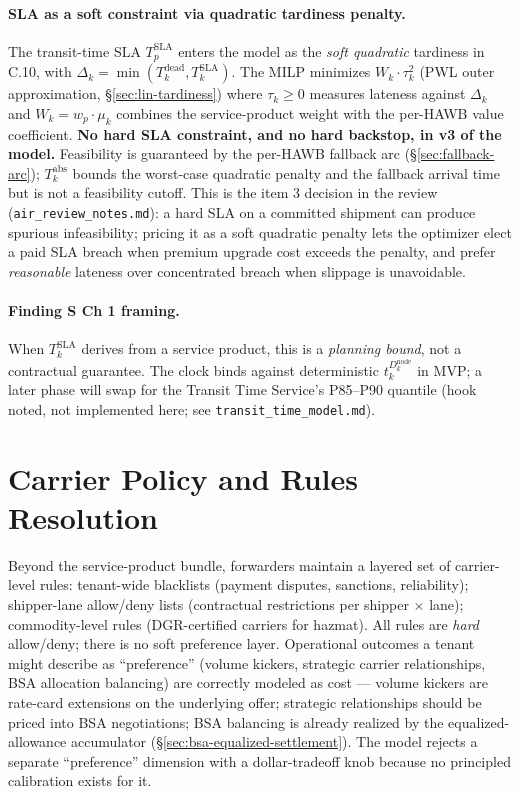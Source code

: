 \documentclass[11pt,a4paper]{article}
\theoremstyle{definition}
\begin{document}
\paragraph{SLA as a soft constraint via quadratic tardiness penalty.}
The transit-time SLA $T^{\text{SLA}}_p$ enters the model as the \emph{soft
quadratic} tardiness in C.10, with $\Delta_k = \min(T_k^{\text{dead}},
T_k^{\text{SLA}})$. The MILP minimizes $W_k \cdot \tau_k^2$ (PWL outer
approximation, \S\ref{sec:lin-tardiness}) where $\tau_k \geq 0$ measures
lateness against $\Delta_k$ and $W_k = w_p \cdot \mu_k$ combines the
service-product weight with the per-HAWB value coefficient.
\textbf{No hard SLA constraint, and no hard backstop, in v3 of the model.}
Feasibility is guaranteed by the per-HAWB fallback arc
(\S\ref{sec:fallback-arc}); $T_k^{\text{abs}}$ bounds the worst-case
quadratic penalty and the fallback arrival time but is not a feasibility
cutoff. This is the item 3 decision in the review
(\texttt{air\_review\_notes.md}): a hard SLA on a committed shipment can
produce spurious infeasibility; pricing it as a soft quadratic penalty lets
the optimizer elect a paid SLA breach when premium upgrade cost exceeds the
penalty, and prefer \emph{reasonable} lateness over concentrated breach when
slippage is unavoidable.

\paragraph{Finding S Ch 1 framing.}
When $T_k^{\text{SLA}}$ derives from a service product, this is a
\emph{planning bound}, not a contractual guarantee. The clock binds against
deterministic $t_k^{D_k^{\text{node}}}$ in MVP; a later phase will swap for
the Transit Time Service's P85--P90 quantile (hook noted, not implemented
here; see \texttt{transit\_time\_model.md}).

\section{Carrier Policy and Rules Resolution}
\label{sec:carrier-policy}

Beyond the service-product bundle, forwarders maintain a layered set of
carrier-level rules: tenant-wide blacklists (payment disputes, sanctions,
reliability); shipper-lane allow/deny lists (contractual restrictions per
shipper $\times$ lane); commodity-level rules (DGR-certified carriers for
hazmat). All rules are \emph{hard} allow/deny; there is no soft preference
layer. Operational outcomes a tenant might describe as ``preference''
(volume kickers, strategic carrier relationships, BSA allocation balancing)
are correctly modeled as cost --- volume kickers are rate-card extensions
on the underlying offer; strategic relationships should be priced into BSA
negotiations; BSA balancing is already realized by the equalized-allowance
accumulator (\S\ref{sec:bsa-equalized-settlement}). The model rejects
a separate ``preference'' dimension with a dollar-tradeoff knob because no
principled calibration exists for it.
\end{document}

